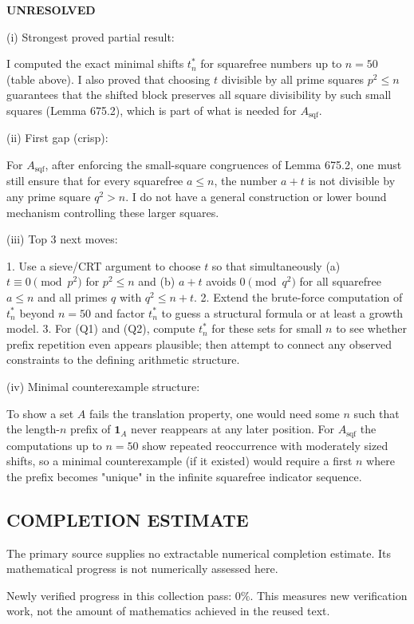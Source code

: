 \textbf{UNRESOLVED}

(i) Strongest proved partial result:

I computed the exact minimal shifts $t_n^*$ for squarefree numbers up to $n=50$ (table above). I also proved that choosing $t$ divisible by all prime squares $p^2\le n$ guarantees that the shifted block preserves all square divisibility by such small squares (Lemma 675.2), which is part of what is needed for $A_{\mathrm{sqf}}$.

(ii) First gap (crisp):

For $A_{\mathrm{sqf}}$, after enforcing the small-square congruences of Lemma 675.2, one must still ensure that for every squarefree $a\le n$, the number $a+t$ is not divisible by any prime square $q^2>n$. I do not have a general construction or lower bound mechanism controlling these larger squares.

(iii) Top 3 next moves:

1. Use a sieve/CRT argument to choose $t$ so that simultaneously (a) $t\equiv 0\pmod{p^2}$ for $p^2\le n$ and (b) $a+t$ avoids $0\pmod{q^2}$ for all squarefree $a\le n$ and all primes $q$ with $q^2\le n+t$.
2. Extend the brute-force computation of $t_n^*$ beyond $n=50$ and factor $t_n^*$ to guess a structural formula or at least a growth model.
3. For (Q1) and (Q2), compute $t_n^*$ for these sets for small $n$ to see whether prefix repetition even appears plausible; then attempt to connect any observed constraints to the defining arithmetic structure.

(iv) Minimal counterexample structure:

To show a set $A$ fails the translation property, one would need some $n$ such that the length-$n$ prefix of $\mathbf 1_A$ never reappears at any later position. For $A_{\mathrm{sqf}}$ the computations up to $n=50$ show repeated reoccurrence with moderately sized shifts, so a minimal counterexample (if it existed) would require a first $n$ where the prefix becomes "unique" in the infinite squarefree indicator sequence.




\subsection*{COMPLETION ESTIMATE}
The primary source supplies no extractable numerical completion estimate. Its mathematical progress is not numerically assessed here.

Newly verified progress in this collection pass: $0\%$. This measures new verification work, not the amount of mathematics achieved in the reused text.
